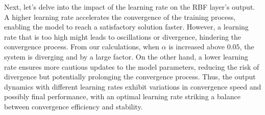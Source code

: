 Next, let's delve into the impact of the learning rate on the RBF layer's output. A higher learning rate accelerates the convergence of the training process, enabling the model to reach a satisfactory solution faster.
However, a learning rate that is too high might leads to oscillations or divergence, hindering the convergence process.
From our calculations, when $\alpha$ is increased above $0.05$, the system is diverging and by a large factor. 
On the other hand, a lower learning rate ensures more cautious updates to the model parameters, reducing the risk of divergence but potentially prolonging the convergence process.
Thus, the output dynamics with different learning rates exhibit variations in convergence speed and possibly final performance, with an optimal learning rate striking a balance between convergence efficiency and stability.